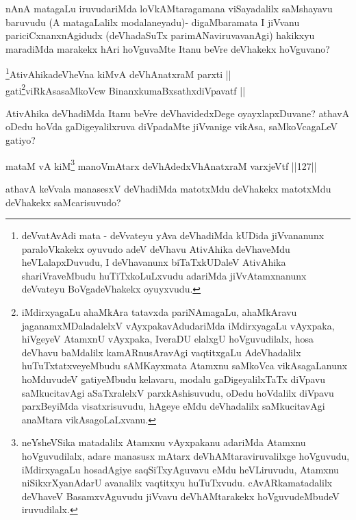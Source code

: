 \begin{artha}
nAnA matagaLu iruvudariMda loVkAMtaragamana viSayadalilx
saMshayavu baruvudu  (A matagaLalilx modalaneyadu)- digaMbaramata I jiVvanu
pariciCxnanxnAgidudx (deVhadaSuTx parimANaviruvavanAgi) hakikxyu
maradiMda marakekx hAri hoVguvaMte Itanu beVre deVhakekx hoVguvano?
\end{artha}



\begin{shl}
\footnote{deVvatAvAdi mata - deVvateyu yAva deVhadiMda kUDida jiVvananunx paraloVkakekx oyuvudo adeV deVhavu AtivAhika deVhaveMdu heVLalapxDuvudu, I deVhavanunx biTaTxkUDaleV AtivAhika shariVraveMbudu huTiTxkoLuLxvudu adariMda jiVvAtamxnanunx deVvateyu BoVgadeVhakekx oyuyxvudu.}AtivAhikadeVheVna kiMvA deVhAnatxraM parxti || \\ 
gati\footnote{iMdirxyagaLu ahaMkAra tatavxda pariNAmagaLu, ahaMkAravu jaganamxMDaladalelxV vAyxpakavAdudariMda iMdirxyagaLu vAyxpaka, hiVgeyeV AtamxnU vAyxpaka, IveraDU elalxgU hoVguvudilalx, hosa deVhavu baMdalilx kamARnusAravAgi vaqtitxgaLu AdeVhadalilx huTuTxtatxveyeMbudu sAMKayxmata Atamxnu saMkoVca vikAsagaLanunx hoMduvudeV gatiyeMbudu kelavaru, modalu gaDigeyalilxTaTx diVpavu saMkucitavAgi aSaTxralelxV parxkAshisuvudu, oDedu hoVdalilx diVpavu parxBeyiMda visatxrisuvudu, hAgeye eMdu deVhadalilx saMkucitavAgi anaMtara vikAsagoLaLxvanu.}viRkAsasaMkoVcw BinanxkumaBxsathxdiVpavatf || 
\end{shl}


\begin{artha}
AtivAhika deVhadiMda Itanu beVre deVhavidedxDege
oyayxlapxDu\-vane? athavA oDedu hoVda gaDigeyalilxruva diVpadaMte
jiVvanige vikAsa, saMkoVcagaLeV gatiyo?
\end{artha}



\begin{shl}
mataM vA kiM\footnote{neYsheVSika matadalilx Atamxnu vAyxpakanu adariMda Atamxnu hoVguvudilalx, adare manasusx mAtarx deVhAMtaraviruvalilxge hoVguvudu, iMdirxyagaLu hosadAgiye saqSiTxyAguvavu eMdu heVLiruvudu, Atamxnu niSikxrXyanAdarU avanalilx vaqtitxyu huTuTxvudu. cAvARkamatadalilx deVhaveV BasamxvAguvudu jiVvavu deVhAMtarakekx hoVguvudeMbudeV iruvudilalx.} manoVmAtarx deVhAdedxVhAnatxraM varxjeVtf \hfill ||127||  
\end{shl}

\begin{artha}
athavA keVvala manasesxV deVhadiMda matotxMdu deVhakekx\break
matotxMdu deVhakekx saMcarisuvudo?
\end{artha}

